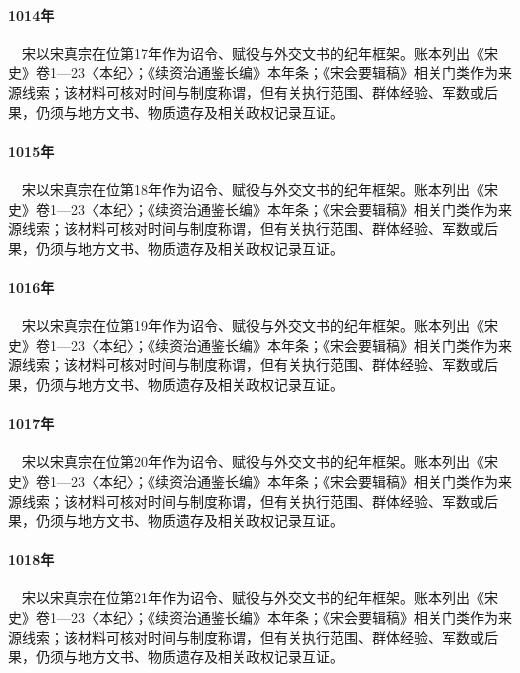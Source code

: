 \paragraph{1014年}　宋以宋真宗在位第17年作为诏令、赋役与外交文书的纪年框架。账本列出《宋史》卷1—23〈本纪〉；《续资治通鉴长编》本年条；《宋会要辑稿》相关门类作为来源线索；该材料可核对时间与制度称谓，但有关执行范围、群体经验、军数或后果，仍须与地方文书、物质遗存及相关政权记录互证。

\paragraph{1015年}　宋以宋真宗在位第18年作为诏令、赋役与外交文书的纪年框架。账本列出《宋史》卷1—23〈本纪〉；《续资治通鉴长编》本年条；《宋会要辑稿》相关门类作为来源线索；该材料可核对时间与制度称谓，但有关执行范围、群体经验、军数或后果，仍须与地方文书、物质遗存及相关政权记录互证。

\paragraph{1016年}　宋以宋真宗在位第19年作为诏令、赋役与外交文书的纪年框架。账本列出《宋史》卷1—23〈本纪〉；《续资治通鉴长编》本年条；《宋会要辑稿》相关门类作为来源线索；该材料可核对时间与制度称谓，但有关执行范围、群体经验、军数或后果，仍须与地方文书、物质遗存及相关政权记录互证。

\paragraph{1017年}　宋以宋真宗在位第20年作为诏令、赋役与外交文书的纪年框架。账本列出《宋史》卷1—23〈本纪〉；《续资治通鉴长编》本年条；《宋会要辑稿》相关门类作为来源线索；该材料可核对时间与制度称谓，但有关执行范围、群体经验、军数或后果，仍须与地方文书、物质遗存及相关政权记录互证。

\paragraph{1018年}　宋以宋真宗在位第21年作为诏令、赋役与外交文书的纪年框架。账本列出《宋史》卷1—23〈本纪〉；《续资治通鉴长编》本年条；《宋会要辑稿》相关门类作为来源线索；该材料可核对时间与制度称谓，但有关执行范围、群体经验、军数或后果，仍须与地方文书、物质遗存及相关政权记录互证。

